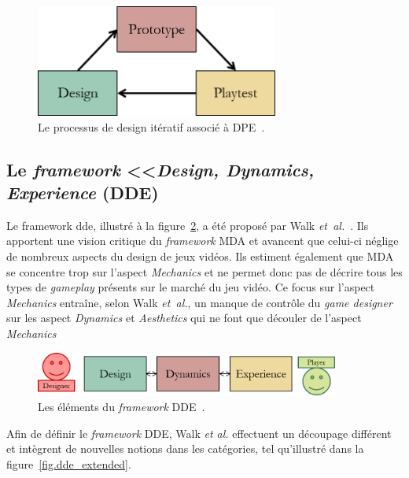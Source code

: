 \begin{figure}[H]
    \centering
    \includegraphics[width=8cm]{10_img/chap3/iteration_prototype.png} 
    \caption{Le processus de design itératif associ\'e \`a DPE~\cite{Winn2011}.}
    \label{fig.dpe_iteratif}
\end{figure}





\subsection{Le \emph{framework} <<\emph{Design, Dynamics, Experience} (DDE)}

Le framework \gls{dde}, illustr\'e \`a la figure~\ref{fig.dde}, a \'et\'e propos\'e par Walk \emph{et~al.}~\cite{DDE}. 
Ils apportent une vision critique du \emph{framework} MDA et avancent que celui-ci néglige de nombreux aspects du design de jeux vidéos. 
Ils estiment également que MDA se concentre trop sur l'aspect \emph{Mechanics} et ne permet donc pas de décrire tous les types de \emph{gameplay} présents sur le marché du jeu vidéo. 
Ce focus sur l'aspect \emph{Mechanics} entraîne, selon Walk \emph{et~al.}, un manque de contrôle du \emph{game designer} sur les aspect \emph{Dynamics} et \emph{Aesthetics} qui ne font que découler de l'aspect \emph{Mechanics}

\begin{figure}[H]
    \begin{center}
    \includegraphics[width=10cm]{10_img/chap3/dde.png} 
    \caption{Les \'el\'ements du \emph{framework} DDE~\cite{DDE}.}
    \label{fig.dde}
    \end{center}
\end{figure}

Afin de définir le \emph{framework} DDE, Walk \emph{et al.} effectuent un découpage différent et intègrent de nouvelles notions dans les catégories, tel qu'illustr\'e dans la figure~\ref{fig.dde_extended}.


